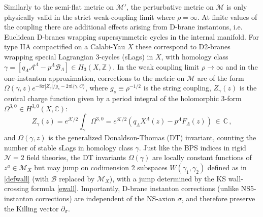 \documentclass[12pt,reqno]{article}
\numberwithin{equation}{section}
\newcommand{\be}{\begin{equation}}
\newcommand{\ee}{\end{equation}}
\newcommand{\I}{\mathrm{i}}
\newcommand{\cA}{\mathcal{A}}
\newcommand{\cB}{\mathcal{B}}
\newcommand{\cK}{\mathcal{K}}
\newcommand{\cM}{\mathcal{M}}
\newcommand{\cN}{\mathcal{N}}
\def\pa{\partial}
\def\pcM{\cM'}
\numberwithin{equation}{section}
\begin{document}
Similarly to the semi-flat metric on $\pcM$, the perturbative metric
on $\cM$ is only physically valid in the strict weak-coupling limit
where $\rho=\infty$. At finite values of the coupling there are
additional effects arising from D-brane instantons, i.e. Euclidean
D-branes wrapping supersymmetric cycles in the internal
manifold. For type IIA compactified on a  Calabi-Yau $X$
these correspond to D2-branes wrapping special Lagrangian
3-cycles (sLags) in $X$, with homology class
$\gamma=[q_\Lambda\cA^{\Lambda}-p^{\Lambda}\cB_\Lambda]\in H_3(X,
\mathbb{Z})$. In the weak coupling limit $\rho\to\infty$ and in the
one-instanton approximation,
corrections to the metric on $\cM$ are of the form
$\Omega(\gamma,z)e^{-8\pi |Z_\gamma|/g_s-2\pi \I\langle \gamma,C\rangle}$,
where $g_s\equiv \rho^{-1/2}$ is the
string coupling, $Z_\gamma(z)$ is the central charge function given by a period integral
of the holomorphic 3-form $\Omega^{3,0}\in H^{3,0}(X,\mathbb{C})$:
\be
\label{Zsugra}
Z_\gamma(z)=e^{\cK/2} \int_\gamma \Omega^{3,0}=
e^{\cK/2}\left( q_\Lambda X^\Lambda(z) - p^\Lambda F_\Lambda(z) \right)
\, \in \, \mathbb{C} \, ,
\ee
 and $\Omega(\gamma,z)$ is the
generalized Donaldson-Thomas (DT) invariant, counting the number
of stable sLags in homology class $\gamma$.
Just like the BPS indices in
rigid $\cN=2$ field theories, the DT invariants $\Omega(\gamma)$ are locally constant functions
of $z^{a}\in \cM_X$ but may jump on codimension 2 subspaces
$W(\gamma_1,\gamma_2) $ defined as in \eqref{defwall} (with $\cB$ replaced by $\cM_X$),
with a jump determined by the  KS wall-crossing formula \eqref{ewall}.
Importantly, D-brane instanton corrections (unlike NS5-instanton corrections)
are independent of the NS-axion
$\sigma$, and therefore preserve the Killing vector $\pa_\sigma$.
\end{document}
